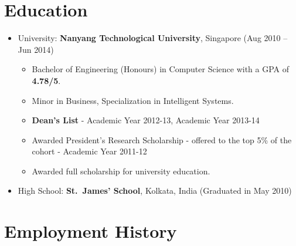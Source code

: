 
\section{Education}\label{education}

\begin{itemize}
\tightlist
\item
  University: \textbf{Nanyang Technological University}, Singapore
  \hfill (Aug 2010 -- Jun 2014)

  \begin{itemize}
  \tightlist
  \item
    Bachelor of Engineering (Honours) in Computer Science with a GPA of
    \textbf{4.78/5}.
  \item
    Minor in Business, Specialization in Intelligent Systems.
  \item
    \textbf{Dean's List} - Academic Year 2012-13, Academic Year 2013-14
  \item
    Awarded President's Research Scholarship - offered to the top 5\% of
    the cohort - Academic Year 2011-12
  \item
    Awarded full scholarship for university education.
  \end{itemize}
\item
  High School: \textbf{St.~James' School}, Kolkata, India
  \hfill (Graduated in May 2010)
\end{itemize}

\section{Employment History}\label{employment-history}

